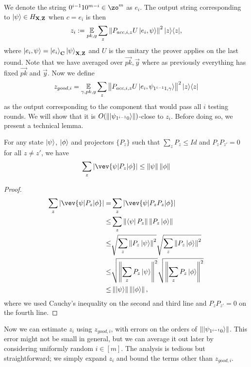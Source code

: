 We denote the string $0^{i-1}10^{m-i} \in \zo^m$ as $e_i$. The output string corresponding to $\ket{\psi} \in H_{\mathbf{X},\mathbf{Z}}$ when $c=e_i$ is then
\begin{equation}
	\label{eq:zi-def}
	z_i:= \operatorname*{\mathbb{E}}_{pk,y} \sum_z \left\lVert P_{acc,i,z} U\ket{e_i,\psi}\right\rVert^2|z\rangle\langle z|,
\end{equation}
where $\ket{e_i,\psi}=\ket{e_i}_{\mathbf{C}}\ket{\psi}_{\mathbf{X},\mathbf{Z}}$ and $U$ is the unitary the prover applies on the last round.
Note that we have averaged over $\vec{pk}, \vec{y}$ where as previously everything has fixed $\vec{pk}$ and $\vec{y}$.
Now we define
\begin{equation}
	\label{eq:zgoodi-def}
	z_{good, i}=\operatorname*{\mathbb{E}}_{\gamma, pk, y} \sum_z \left\lVert P_{acc,i,z} U\ket{e_i,\psi_{1^{i-1}1,\gamma}}\right\rVert^2|z\rangle\langle z|
\end{equation}
as the output corresponding to the component that would pass all $i$ testing rounds.
We will show that it is $O(\left\lVert\ket{\psi_{1^{i-1}0}}\right\rVert)$-close to $z_i$.
Before doing so, we present a technical lemma.
\begin{lemma}\label{lem:samp-tech}
	For any state $\ket{\psi}$,  $\ket{\phi}$ and projectors $\{P_z\}$ such that $\sum_z P_z \leq Id$ and $P_z P_{z'} =0 $ for all $z\neq z'$, we have
	$$  \sum_z |\vev{\psi|P_z|\phi}| \leq \norm{\psi}\norm{\phi} $$
\end{lemma}
\begin{proof}
	\begin{align}
		\sum_z |\vev{\psi|P_z|\phi}| =&\sum_z|\vev{\psi|P_zP_z|\phi}| \nn \\
		\leq& \sum_z \norm{\bra{\psi}P_z} \norm{ P_z\ket{\phi}} \nn \\
		\leq&  \sqrt{\sum_z \norm{P_z\ket{\psi}}^2} \sqrt{\sum_z\norm{P_z\ket{\phi}}^2} \nn \\
		\leq& \sqrt{\norm{\sum_z P_z\ket{\psi}}^2 } \sqrt{\norm{\sum_z P_z\ket{\phi}}^2 } \nn \\
		\leq & \norm{\ket{\psi}}\norm{\ket{\phi}},
	\end{align}
	where we used Cauchy's inequality on the second and third line and $P_z P_{z'} =0 $ on the fourth line.
\end{proof}

Now we can estimate $z_i$ using $z_{good, i}$, with errors on the orders of $\left\lVert\ket{\psi_{1^{i-1}0}}\right\rVert$.
This error might not be small in general,
but we can average it out later by considering uniformly random $i\in[m]$.
The analysis is tedious but straightforward;
we simply expand $z_i$ and bound the terms other than $z_{good, i}$.

